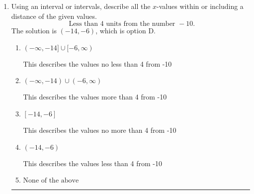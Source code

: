 \documentclass{extbook}[14pt]
\newcommand{\litem}[1]{\item #1

\rule{\textwidth}{0.4pt}}
\begin{document}
\begin{enumerate}
{\begin{enumerate}[label=\Alph*.]
$(-\infty, 2.50] \cup (-4.00, \infty)$, which corresponds to displaying the and-inequality as an or-inequality and getting negatives of the actual endpoints.
\item \( [a, b), \text{ where } a \in [-1.5, 8.25] \text{ and } b \in [-4.5, -1.5] \)

$[2.50, -4.00)$, which is the correct interval but negatives of the actual endpoints.
\item \( (a, b], \text{ where } a \in [0.75, 5.25] \text{ and } b \in [-7.5, -2.25] \)

$(2.50, -4.00]$, which corresponds to flipping the inequality and getting negatives of the actual endpoints.
\item \( (-\infty, a) \cup [b, \infty), \text{ where } a \in [-2.25, 3] \text{ and } b \in [-5.25, -3] \)

$(-\infty, 2.50) \cup [-4.00, \infty)$, which corresponds to displaying the and-inequality as an or-inequality AND flipping the inequality AND getting negatives of the actual endpoints.
\item \( \text{None of the above.} \)

* This is correct as the answer should be $[-2.50, 4.00)$.
\end{enumerate}

\textbf{General Comment:} To solve, you will need to break up the compound inequality into two inequalities. Be sure to keep track of the inequality! It may be best to draw a number line and graph your solution.
}
\litem{
Using an interval or intervals, describe all the $x$-values within or including a distance of the given values.
\[ \text{ Less than } 4 \text{ units from the number } -10. \]The solution is \( (-14, -6) \), which is option D.\begin{enumerate}[label=\Alph*.]
\item \( (-\infty, -14] \cup [-6, \infty) \)

This describes the values no less than 4 from -10
\item \( (-\infty, -14) \cup (-6, \infty) \)

This describes the values more than 4 from -10
\item \( [-14, -6] \)

This describes the values no more than 4 from -10
\item \( (-14, -6) \)

This describes the values less than 4 from -10
\item \( \text{None of the above} \)


\end{enumerate}}
\end{enumerate}
\end{document}
